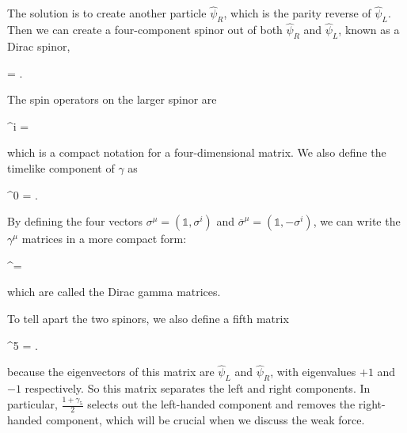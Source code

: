 The solution is to create another particle $\hat \psi_R$, which is the parity reverse of $\hat \psi_L$. Then we can create a four-component spinor out of both $\hat \psi_R$ and $\hat \psi_L$, known as a Dirac spinor,
\begin{e}
  \hat \psi = .
\end{e}
The spin operators on the larger spinor are 
\begin{e}
  \gamma^{i} = 
\end{e}
which is a compact notation for a four-dimensional matrix. We also define the 
timelike component of $\gamma$ as 
\begin{e}
  \gamma^0 = .
\end{e}
By defining the four vectors $\sigma^\mu = (\mathds{1}, \sigma^i)$ and $\overline\sigma^\mu = (\mathds{1}, -\sigma^i)$, we can write the $\gamma^\mu$ matrices in a more compact form:
\begin{e}
  \gamma^\mu = 
  \label{eqn:weyl-rep}
\end{e}
which are called the Dirac gamma matrices.

To tell apart the two spinors, we also define a fifth matrix
\begin{e}
  \gamma^5 = .
  \label{eqn:gamma-5}
\end{e}
because the eigenvectors of this matrix are $\hat \psi_L$ and $\hat \psi_R$, with eigenvalues $+1$ and $-1$ respectively. So this matrix separates the left and right components. In particular, $\frac{1 + \gamma_5}{2}$ selects out the left-handed component and removes the right-handed component, which will be crucial when we discuss the weak force.

